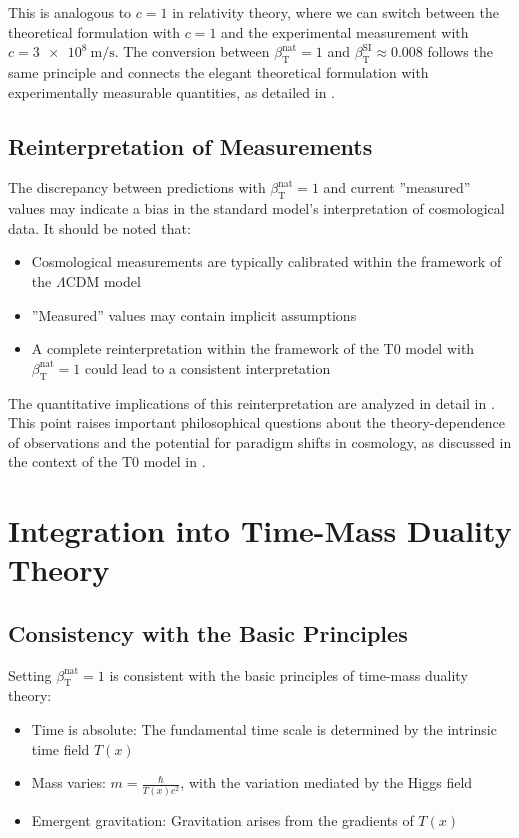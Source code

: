 \documentclass[12pt,a4paper]{article}
\newcommand{\Tfield}{T(x)}
\newcommand{\betaT}{\beta_{\text{T}}}
\begin{document}
	This is analogous to \(c = 1\) in relativity theory, where we can switch between the theoretical formulation with \(c = 1\) and the experimental measurement with \(c = \SI{3e8}{\meter\per\second}\). The conversion between \(\betaT^{\text{nat}} = 1\) and \(\betaT^{\text{SI}} \approx 0.008\) follows the same principle and connects the elegant theoretical formulation with experimentally measurable quantities, as detailed in \cite{pascher_alphabeta_2025}.
	
	\subsection{Reinterpretation of Measurements}
	\label{subsec:reassessment}
	
	The discrepancy between predictions with \(\betaT^{\text{nat}} = 1\) and current ''measured'' values may indicate a bias in the standard model's interpretation of cosmological data. It should be noted that:
	\begin{itemize}
		\item Cosmological measurements are typically calibrated within the framework of the \(\Lambda\)CDM model
		\item ''Measured'' values may contain implicit assumptions
		\item A complete reinterpretation within the framework of the T0 model with \(\betaT^{\text{nat}} = 1\) could lead to a consistent interpretation
	\end{itemize}
	
	The quantitative implications of this reinterpretation are analyzed in detail in \cite{pascher_alphabeta_2025}. This point raises important philosophical questions about the theory-dependence of observations and the potential for paradigm shifts in cosmology, as discussed in the context of the T0 model in \cite{pascher_messdifferenzen_2025}.
	
	\section{Integration into Time-Mass Duality Theory}
	\label{sec:integration}
	
	\subsection{Consistency with the Basic Principles}
	\label{subsec:consistency_principles}
	
	Setting \(\betaT^{\text{nat}} = 1\) is consistent with the basic principles of time-mass duality theory:
	\begin{itemize}
		\item Time is absolute: The fundamental time scale is determined by the intrinsic time field \(\Tfield\)
		\item Mass varies: \(m = \frac{\hbar}{\Tfield c^2}\), with the variation mediated by the Higgs field
		\item Emergent gravitation: Gravitation arises from the gradients of \(\Tfield\)
	\end{itemize}
	
\end{document}
